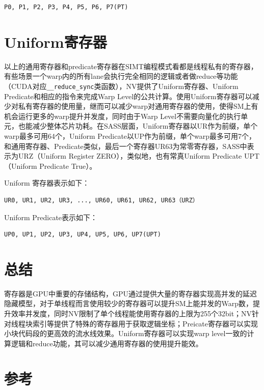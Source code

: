 \begin{lstlisting}
P0, P1, P2, P3, P4, P5, P6, P7(PT)
\end{lstlisting}

\section{Uniform寄存器}

以上的通用寄存器和predicate寄存器在SIMT编程模式看都是线程私有的寄存器，有些场景一个warp内的所有lane会执行完全相同的逻辑或者做reduce等功能（CUDA对应\lstinline|__reduce_sync|类函数），NV提供了Uniform寄存器、Uniform Predicate和相应的指令来完成Warp Level的公共计算。使用Uniform寄存器可以减少对私有寄存器的使用量，继而可以减少warp对通用寄存器的使用，使得SM上有机会运行更多的warp提升并发度，同时由于Warp Level不需要向量化的执行单元，也能减少整体芯片功耗。在SASS层面，Uniform寄存器以UR作为前缀，单个warp最多可用64个，Uniform Predicate以UP作为前缀，单个warp最多可用7个，和通用寄存器、Predicate类似，最后一个寄存器UR63为常零寄存器，SASS中表示为URZ（Uniform Register ZERO），类似地，也有常真Uniform Predicate UPT（Uniform Predicate True）。

Uniform 寄存器表示如下：

\begin{lstlisting}
UR0, UR1, UR2, UR3, ..., UR60, UR61, UR62, UR63（URZ）
\end{lstlisting}

Uniform Predicate表示如下：

\begin{lstlisting}
UP0, UP1, UP2, UP3, UP4, UP5, UP6, UP7(UPT)
\end{lstlisting}

\section{总结}

寄存器是GPU中重要的存储结构，GPU通过提供大量的寄存器实现高并发的延迟隐藏模型，对于单线程而言使用较少的寄存器可以提升SM上能并发的Warp数，提升效率并发度，同时NV限制了单个线程能使用寄存器的上限为255个32bit；NV针对线程块索引等提供了特殊的寄存器用于获取逻辑坐标；Preicate寄存器可以实现小块代码段的更高效的流水线效果。Uniform寄存器可以实现warp level一致的计算逻辑和reduce功能，其可以减少通用寄存器的使用提升能效。

\section{参考}

